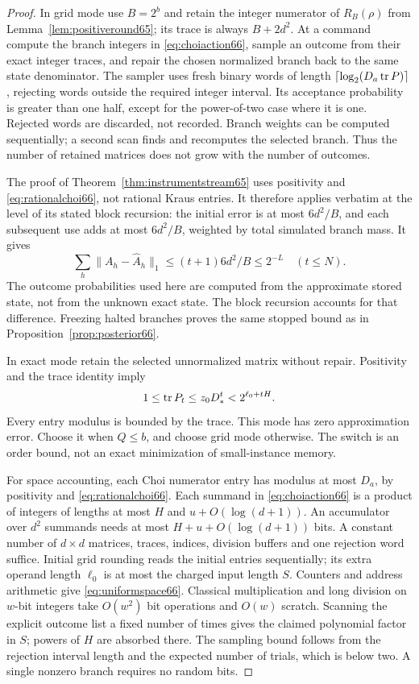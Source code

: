 \begin{proof}
In grid mode use $B=2^b$ and retain the integer numerator of
$R_B(\rho)$ from Lemma~\ref{lem:positiveround65}; its trace is always
$B+2d^2$. At a command compute the branch integers in
\eqref{eq:choiaction66}, sample an outcome from their exact integer
traces, and repair the chosen normalized branch back to the same
state denominator. The sampler uses fresh binary words of length
$\lceil\log_2(D_a\operatorname{tr} P)\rceil$, rejecting words outside the required
integer interval. Its acceptance probability is greater than one half,
except for the power-of-two case where it is one. Rejected words are
discarded, not recorded. Branch weights can be computed sequentially;
a second scan finds and recomputes the selected branch. Thus the
number of retained matrices does not grow with the number of outcomes.

The proof of Theorem~\ref{thm:instrumentstream65} uses positivity and
\eqref{eq:rationalchoi66}, not rational Kraus entries. It therefore
applies verbatim at the level of its stated block recursion: the
initial error is at most $6d^2/B$, and each subsequent use adds at
most $6d^2/B$, weighted by total simulated branch mass. It gives
\[
       \sum_h\|A_h-\widehat A_h\|_1
                \le(t+1)6d^2/B\le2^{-L}\quad(t\le N).
\]
The outcome probabilities used here are computed from the approximate
stored state, not from the unknown exact state. The block recursion
accounts for that difference. Freezing halted branches proves the same
stopped bound as in Proposition~\ref{prop:posterior66}.

In exact mode retain the selected unnormalized matrix without repair.
Positivity and the trace identity imply
\[
           1\le\operatorname{tr} P_t\le z_0D_*^t<2^{\ell_0+tH}.
\]
Every entry modulus is bounded by the trace. This mode has zero
approximation error. Choose it when $Q\le b$, and choose grid mode
otherwise. The switch is an order bound, not an exact minimization of
small-instance memory.

For space accounting, each Choi numerator entry has modulus at most
$D_a$, by positivity and \eqref{eq:rationalchoi66}. Each summand in
\eqref{eq:choiaction66} is a product of integers of lengths at most
$H$ and $u+O(\log(d+1))$. An accumulator over $d^2$ summands needs
at most $H+u+O(\log(d+1))$ bits. A constant number of $d\times d$
matrices, traces, indices, division buffers and one rejection word
suffice. Initial grid rounding reads the initial entries sequentially;
its extra operand length $\ell_0$ is at most the charged input length
$S$. Counters and address arithmetic give \eqref{eq:uniformspace66}.
Classical multiplication and long division on $w$-bit integers take
$O(w^2)$ bit operations and $O(w)$ scratch. Scanning the explicit
outcome list a fixed number of times gives the claimed polynomial
factor in $S$; powers of $H$ are absorbed there. The sampling bound
follows from the rejection interval length and the expected number of
trials, which is below two. A single nonzero branch requires no random
bits.


\end{proof}
